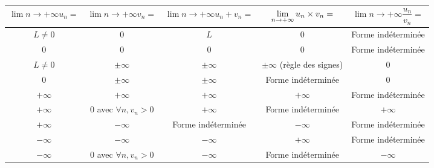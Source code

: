 \documentclass[10pt]{article} %
\begin{document}
\begin{tabular}{|C|C!{\vrule width 1.25pt}C|C|C|}
    \hline
    $\lim{n\to+\infty}u_n=$ & $\lim{n\to+\infty}v_n=$     & $\lim{n\to+\infty}u_n+v_n=$ & $\lim{n\to+\infty}u_n\x v_n=$  & $\lim{n\to+\infty}\dfrac{u_n}{v_n}=$ \\
    \hline
    $L\not=0$               & $0$                         & $L$                         & $0$                            & Forme indéterminée                   \\
    \hline
    $0$                     & $0$                         & $0$                         & $0$                            & Forme indéterminée                   \\
    \hline
    $L\not=0$               & $\pm\infty$                 & $\pm\infty$                 & $\pm\infty$ (règle des signes) & $0$                                  \\
    \hline
    $0$                     & $\pm\infty$                 & $\pm\infty$                 & Forme indéterminée             & $0$                                  \\
    \hline
    $+\infty$               & $+\infty$                   & $+\infty$                   & $+\infty$                      & Forme indéterminée                   \\
    \hline
    $+\infty$               & $0$ avec $\forall n, v_n>0$ & $+\infty$                   & Forme indéterminée             & $+\infty$                            \\
    \hline
    $+\infty$               & $-\infty$                   & Forme indéterminée          & $-\infty$                      & Forme indéterminée                   \\
    \hline
    $-\infty$               & $-\infty$                   & $-\infty$                   & $+\infty$                      & Forme indéterminée                   \\
    \hline
    $-\infty$               & $0$ avec $\forall n, v_n>0$ & $-\infty$                   & Forme indéterminée             & $-\infty$                            \\
    \hline
\end{tabular}

\vspace{10pt}


\newpage
\end{document}
